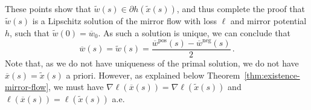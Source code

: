 \documentclass[11pt,english,reqno]{article}
\newcommand{\pos}{\text{pos}}
\renewcommand{\neg}{\text{neg}}
\theoremstyle{plain}
\theoremstyle{definition}
\theoremstyle{remark}
\numberwithin{equation}{section}
\begin{document}
These points show that $\widetilde{w}(s) \in \partial h(\widetilde{x}(s))$, and thus complete the proof that $\widetilde{w}(s)$ is a Lipschitz solution of the mirror flow with loss $\ell$ and mirror potential $h$, such that $\widetilde{w}(0) = \overline{w}_0$. As such a solution is unique, we can conclude that 
\begin{equation*}
	\overline{w}(s) = \widetilde{w}(s) = \frac{\overline{w}^\pos(s) - \overline{w}^\neg(s)}{2} \, .
\end{equation*}
Note that, as we do not have uniqueness of the primal solution, we do not have $\overline{x}(s) = \widetilde{x}(s)$ a priori. However, as explained below Theorem~\ref{thm:existence-mirror-flow}, we must have $\nabla \ell(\overline{x}(s)) = \nabla \ell(\widetilde{x}(s))$ and $\ell(\overline{x}(s)) = \ell(\widetilde{x}(s))$ a.e. 
\end{document}
